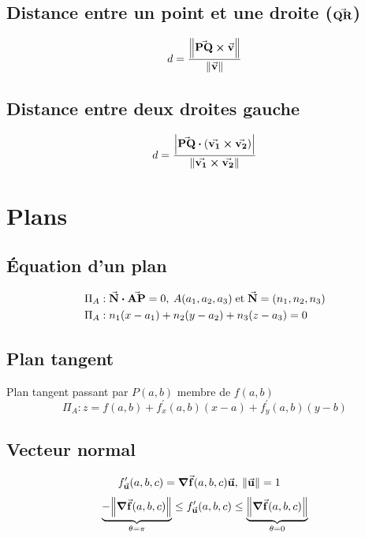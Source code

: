 \subsection{Distance entre un point et une droite ($\va{QR}$)}
\begin{equation*}
    d = \frac{\norm{\va{PQ}\cp \va{v}}}{\norm{\va{v}}}
\end{equation*}

\subsection{Distance entre deux droites gauche}
\begin{equation*}
    d = \frac{\abs{\va{PQ}\vdot\qty(\va{v_1} \cp \va{v_2})}}{\norm{\va{v_1}\cp \va{v_2}}}
\end{equation*}

\section{Plans}
\subsection{Équation d'un plan}
\begin{align*}
    \Pi_A &: \va{N}\vdot\va{AP} = 0,\:A\qty(a_1,a_2,a_3)\; \mathrm{et}\; \va{N}=\qty(n_1,n_2,n_3)\\
    \Pi_A &: n_1\qty(x-a_1) + n_2\qty(y-a_2) + n_3\qty(z-a_3) = 0
\end{align*}

\subsection{Plan tangent}
\raggedright
Plan tangent passant par $P(a,b)$ membre de $f(a,b)$
\begin{equation*}
    \Pi_A : z = f(a,b) + f^\prime_x(a,b)(x-a) + f^\prime_y(a,b)(y-b)
\end{equation*}

\subsection{Vecteur normal}
\begin{align*}
    f^\prime_{\va{u}} (a,b,c) &= \grad{\va{f}}(a,b,c)\va{u},\: \norm{\va{u}}=1 
\end{align*}
\begin{gather*}
    \underbrace{-\norm{\grad{\va{f}}\qty(a,b,c)}}_{\theta = \pi}\leq f^\prime_{\va{u}}\qty(a,b,c)\leq \underbrace{\norm{\grad{\va{f}}\qty(a,b,c)}}_{\theta = 0}
\end{gather*}

